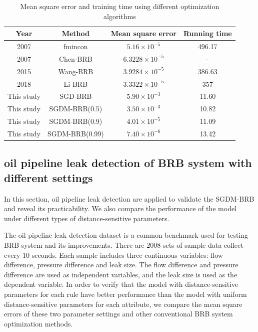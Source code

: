 \documentclass{ieeeaccess}
\begin{document}
\begin{table}
    \caption{Mean square error and training time using different optimization algorithms}
    \centering
    \label{tab3}
    \begin{tabular}{cccc}
        \hline
        Year       & Method             & Mean square error     & Running time \\
        \hline
        2007       & fmincon\cite{a10}  & $5.16\times10^{-5}$   & 496.17       \\
        2007       & Chen-BRB\cite{a13} & $6.3228\times10^{-5}$ & -            \\
        2015       & Wang-BRB\cite{a15} & $3.9284\times10^{-5}$ & 386.63       \\
        2018       & Li-BRB\cite{a36}   & $3.3322\times10^{-5}$ & 357          \\
        This study & SGD-BRB            & $5.90\times10^{-3}$   & 11.60        \\
        This study & SGDM-BRB(0.5)      & $3.50\times10^{-3}$   & 10.82        \\
        This study & SGDM-BRB(0.9)      & $4.01\times10^{-5}$   & 11.09        \\
        This study & SGDM-BRB(0.99)     & $7.40\times10^{-6}$   & 13.42        \\
        \hline
    \end{tabular}
\end{table}

\subsection{oil pipeline leak detection of BRB system with different settings}
In this section, oil pipeline leak detection are applied to validate the SGDM-BRB and reveal its practicability.
We also compare the performance of the model under different types of distance-sensitive parameters.

The oil pipeline leak detection dataset is a common benchmark used for testing BRB system and its improvements.
There are $2008$ sets of sample data collect every $10$ seconds. Each sample includes three continuous variables: flow difference, pressure difference and leak size.
The flow difference and pressure difference are used as independent variables, and the leak size is used as the dependent variable.
In order to verify that the model with distance-sensitive parameters for each rule have better performance than the model with uniform distance-sensitive parameters for each attribute,
we compare the mean square errors of these two parameter settings and other conventional BRB system optimization methods.
\end{document}

